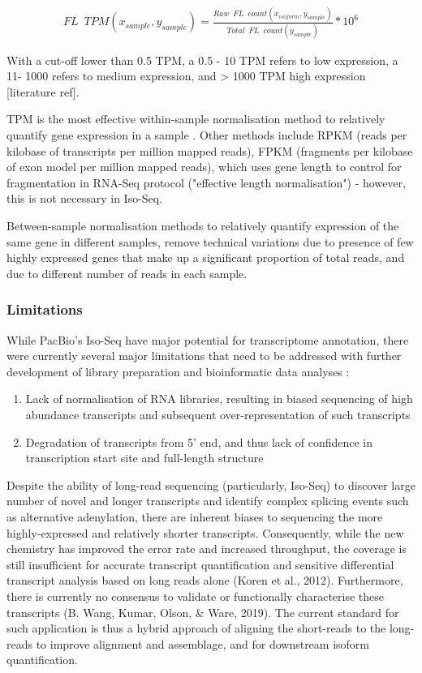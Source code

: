 \begin{align*}
	FL\;\:TPM (x_{sample},y_{sample})=\frac{Raw\;\:FL\;\:count (x_{isoform},y_{sample})}{Total\;\:FL\;\:count (y_{sample})} *10^6
\end{align*}

With a cut-off lower than 0.5 TPM, a 0.5 - 10 TPM refers to low expression, a 11- 1000 refers to medium expression, and > 1000 TPM high expression [literature ref]. 

TPM is the most effective within-sample normalisation method to relatively quantify gene expression in a sample \cite{Abrams2019}. Other methods include RPKM (reads per kilobase of transcripts per million mapped reads), FPKM (fragments per kilobase of exon model per million mapped reads), which uses gene length to control for fragmentation in RNA-Seq protocol ("effective length normalisation") - however, this is not necessary in Iso-Seq.  

Between-sample normalisation methods to relatively quantify expression of the same gene in different samples, remove technical variations due to presence of few highly expressed genes that make up a significant proportion of total reads, and due to different number of reads in each sample. 

\subsubsection{Limitations}
While PacBio's Iso-Seq have major potential for transcriptome annotation, there were currently several major limitations that need to be addressed with further development of library preparation and bioinformatic data analyses \cite{Kuo2017}: 
\begin{enumerate}
	\item Lack of normalisation of RNA libraries, resulting in biased sequencing of high abundance transcripts and subsequent over-representation of such transcripts 
	\item Degradation of transcripts from 5' end, and thus lack of confidence in transcription start site and full-length structure 
\end{enumerate}

Despite the ability of long-read sequencing (particularly, Iso-Seq) to discover large number of novel and longer transcripts and identify complex splicing events such as alternative adenylation, there are inherent biases to sequencing the more highly-expressed and relatively shorter transcripts. Consequently, while the new chemistry has improved the error rate and increased throughput, the coverage is still insufficient for accurate transcript quantification and sensitive differential transcript analysis based on long reads alone (Koren et al., 2012). Furthermore, there is currently no consensus to validate or functionally characterise these transcripts (B. Wang, Kumar, Olson, \& Ware, 2019). The current standard for such application is thus a hybrid approach of aligning the short-reads to the long-reads to improve alignment and assemblage, and for downstream isoform quantification. 

